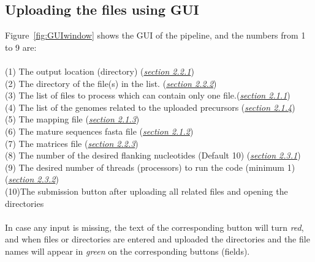 \documentclass[a4paper,20pt]{report}
\begin{document}
\subsection*{Uploading the files using GUI}
\noindent
Figure~\ref{fig:GUIwindow} shows the GUI of the pipeline, and the numbers from 1 to 9 are:\\\\
(1) The output location (directory) (\hyperref[sec:output]{\textit{section 2.2.1}})\\
(2) The directory of the file(s) in the list. (\hyperref[sec:filesdir]{\textit{section 2.2.2}})\\
(3) The list of files to process which can contain only one file.(\hyperref[sec:fastafile]{\textit{section 2.1.1}})\\
(4) The list of the genomes related to the uploaded precursors (\hyperref[sec:genomes]{\textit{section 2.1.4}})\\
(5) The mapping file (\hyperref[sec:map]{\textit{section 2.1.3}})\\
(6) The mature sequences fasta file (\hyperref[sec:mature]{\textit{section 2.1.2}})\\
(7) The matrices file (\hyperref[sec:matrix]{\textit{section 2.2.3}})\\
(8) The number of the desired flanking nucleotides (Default 10) (\hyperref[sec:flanking]{\textit{section 2.3.1}})\\
(9) The desired number of threads (processors) to run the code (minimum 1)(\hyperref[sec:threads]{\textit{section 2.3.2}})\\
(10)The submission button after uploading all related files and opening the directories\\\\
In case any input is missing, the text of the corresponding button will turn \textit{red}, and when files or directories are 
entered and uploaded the directories and the file names will appear in \textit{green} on the corresponding buttons (fields).
\end{document}
